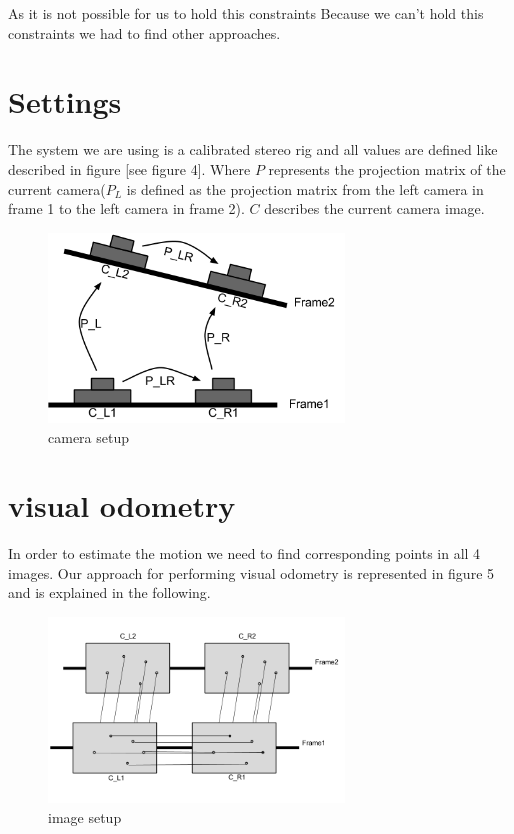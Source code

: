\documentclass[11pt]{article}
\begin{document}
	As it is not possible for us to hold this constraints 
	Because we can’t hold this constraints we had to find other approaches.

	\section{Settings}
	The system we are using is a calibrated stereo rig \cite{malik-hiller-2015} and all values are defined like described in figure [see figure 4]. Where $P$ represents the projection matrix of the current camera($P_L$ is defined as the projection matrix from the left camera in frame 1 to the left camera in frame 2). $C$ describes the current camera image.
	
	\begin{figure}[H]
		\centering
		\includegraphics[width=0.7\textwidth]{images/camera_setup.png}
		\caption{camera setup}
	\end{figure}
	
	\section{visual odometry}
	In order to estimate the motion we need to find corresponding points in all 4 images. Our approach for performing visual odometry is represented in figure 5 and is explained in the following.
	
	\begin{figure}[H]
		\centering
		\includegraphics[width=0.7\textwidth]{images/image_setup.png}
		\caption{image setup}
	\end{figure}
	
\end{document}
